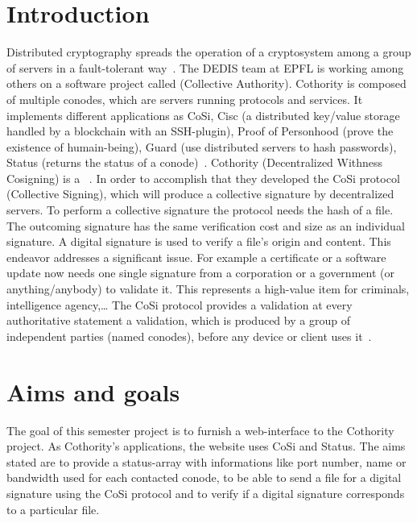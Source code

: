 \documentclass[11pt, a4paper, twoside, openright, openany]{article} %
\begin{document}
\begin{center}

\end{center}

\tableofcontents

\clearpage

\section{Introduction}
Distributed cryptography spreads the operation of a cryptosystem among a group
of servers in a fault-tolerant way~\cite{definition}.
\newline
The DEDIS team at EPFL is working among others on a software project called  (Collective Authority).
Cothority is composed of multiple conodes, which are servers running protocols and services.
It implements different applications as CoSi, Cisc (a distributed key/value storage handled by a blockchain with an SSH-plugin),
Proof of Personhood (prove the existence of humain-being), Guard (use distributed servers to hash passwords),
Status (returns the status of a conode)~\cite{cothorityWiki}.
\newline \newline
Cothority (Decentralized Withness Cosigning) is a ~\cite{cothorityInfo}.
\newline
In order to accomplish that they developed the CoSi protocol (Collective Signing),
which will produce a collective signature by decentralized servers.
To perform a collective signature the protocol needs the hash of a file.
The outcoming signature has the same verification cost and size as an individual signature.
A digital signature is used to verify a file's origin and content.
\newline
This endeavor addresses a significant issue. For example a certificate or a software
update now needs one single signature from a corporation or a government (or anything/anybody) to validate it.
This represents a high-value item for criminals, intelligence agency,\ldots
The CoSi protocol provides a validation at every authoritative statement a validation,
which is produced by a group of independent parties (named conodes),
before any device or client uses it~\cite{cosi}.
\bigbreak



\section{Aims and goals}
The goal of this semester project is to furnish a web-interface to the Cothority project.
As Cothority's applications, the website uses CoSi and Status.
\newline
The aims stated are to provide a status-array with informations like port number,
name or bandwidth used for each contacted conode, to be able to send a file for
a digital signature using the CoSi protocol and to verify if a digital signature
corresponds to a particular file.
\bigbreak
\end{document}
